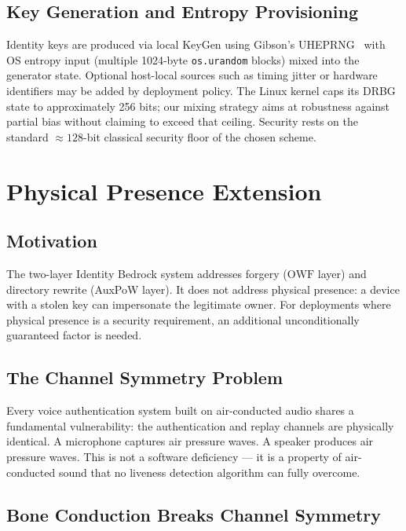 \documentclass[11pt,a4paper]{article}
\theoremstyle{definition}
\newcommand{\OWF}{\mathrm{OWF}}
\newcommand{\BD}{\textsf{Identity Bedrock}}
\begin{document}
\subsection{Key Generation and Entropy Provisioning}

Identity keys are produced via local KeyGen using Gibson's UHEPRNG~%
\cite{Gibson} with OS entropy input (multiple 1024-byte
\texttt{os.urandom} blocks) mixed into the generator state.
Optional host-local sources such as timing jitter or hardware
identifiers may be added by deployment policy. The Linux kernel
caps its DRBG state to approximately 256 bits; our mixing strategy
aims at robustness against partial bias without claiming to exceed
that ceiling. Security rests on the standard
$\approx 128$-bit classical security floor of the chosen scheme.

\section{Physical Presence Extension}
\label{sec:physical}

\subsection{Motivation}

The two-layer \BD{} system addresses forgery ($\OWF$ layer) and
directory rewrite (AuxPoW layer). It does not address physical
presence: a device with a stolen key can impersonate the legitimate
owner. For deployments where physical presence is a security
requirement, an additional unconditionally guaranteed factor is
needed.

\subsection{The Channel Symmetry Problem}

Every voice authentication system built on air-conducted audio shares
a fundamental vulnerability: the authentication and replay channels
are physically identical. A microphone captures air pressure waves.
A speaker produces air pressure waves. This is not a software
deficiency --- it is a property of air-conducted sound that no
liveness detection algorithm can fully overcome.

\subsection{Bone Conduction Breaks Channel Symmetry}
\label{sec:impedance}
\end{document}
